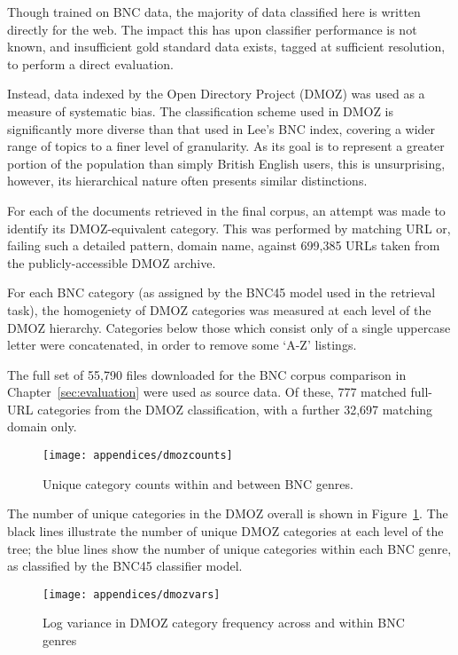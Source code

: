 
Though trained on BNC data, the majority of data classified here is written directly for the web.  The impact this has upon classifier performance is not known, and insufficient gold standard data exists, tagged at sufficient resolution, to perform a direct evaluation.

Instead, data indexed by the Open Directory Project (DMOZ) was used as a measure of systematic bias.  The classification scheme used in DMOZ is significantly more diverse than that used in Lee's BNC index, covering a wider range of topics to a finer level of granularity.  As its goal is to represent a greater portion of the population than simply British English users, this is unsurprising, however, its hierarchical nature often presents similar distinctions.

For each of the documents retrieved in the final corpus, an attempt was made to identify its DMOZ-equivalent category.  This was performed by matching URL or, failing such a detailed pattern, domain name, against 699,385 URLs taken from the publicly-accessible DMOZ archive.

For each BNC category (as assigned by the BNC45 model used in the retrieval task), the homogeniety of DMOZ categories was measured at each level of the DMOZ hierarchy.  Categories below those which consist only of a single uppercase letter were concatenated, in order to remove some `A-Z' listings.


The full set of 55,790 files downloaded for the BNC corpus comparison in Chapter~\ref{sec:evaluation} were used as source data.  Of these, 777 matched full-URL categories from the DMOZ classification, with a further 32,697 matching domain only.


\begin{figure}[h]
    \centering
    \texttt{[image: appendices/dmozcounts]}
    \caption{Unique category counts within and between BNC genres.}
    \label{fig:appendices:dmozcounts}
\end{figure}

The number of unique categories in the DMOZ overall is shown in Figure~\ref{fig:appendices:dmozcounts}.  The black lines illustrate the number of unique DMOZ categories at each level of the tree; the blue lines show the number of unique categories within each BNC genre, as classified by the BNC45 classifier model.


\begin{figure}[h]
    \centering
    \texttt{[image: appendices/dmozvars]}
    \caption{Log variance in DMOZ category frequency across and within BNC genres}
    \label{fig:appendices:dmozvars}
\end{figure}

